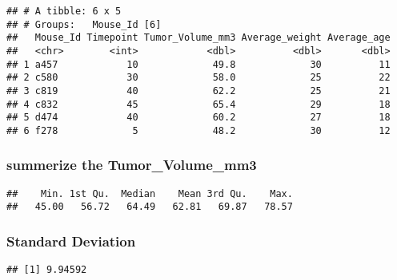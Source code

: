 \documentclass[
]{article}
\newenvironment{Shaded}{\begin{snugshade}}{\end{snugshade}}
\newcommand{\FunctionTok}[1]{\textcolor[rgb]{0.00,0.00,0.00}{#1}}
\newcommand{\NormalTok}[1]{#1}
\newcommand{\SpecialCharTok}[1]{\textcolor[rgb]{0.00,0.00,0.00}{#1}}
\begin{document}
\begin{verbatim}
## # A tibble: 6 x 5
## # Groups:   Mouse_Id [6]
##   Mouse_Id Timepoint Tumor_Volume_mm3 Average_weight Average_age
##   <chr>        <int>            <dbl>          <dbl>       <dbl>
## 1 a457            10             49.8             30          11
## 2 c580            30             58.0             25          22
## 3 c819            40             62.2             25          21
## 4 c832            45             65.4             29          18
## 5 d474            40             60.2             27          18
## 6 f278             5             48.2             30          12
\end{verbatim}

\hypertarget{summerize-the-tumor_volume_mm3-2}{%
\subsubsection{summerize the
Tumor\_Volume\_mm3}\label{summerize-the-tumor_volume_mm3-2}}

\begin{Shaded}
\end{Shaded}

\begin{verbatim}
##    Min. 1st Qu.  Median    Mean 3rd Qu.    Max. 
##   45.00   56.72   64.49   62.81   69.87   78.57
\end{verbatim}

\hypertarget{standard-deviation-2}{%
\subsubsection{Standard Deviation}\label{standard-deviation-2}}

\begin{Shaded}
\end{Shaded}

\begin{verbatim}
## [1] 9.94592
\end{verbatim}
\end{document}
